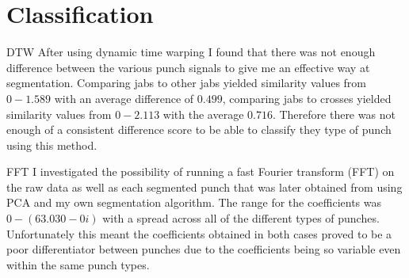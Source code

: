 \begin{figure}[h]
\begin{minipage}{6.0cm}
    \centering
    \label{fig:kinect3}
\end{minipage}
\end{figure}

\section{Classification}

DTW
After using dynamic time warping I found that there was not enough difference between the various punch signals to give me an effective way at segmentation. Comparing jabs to other jabs yielded similarity values from $0 - 1.589$ with an average difference of $0.499$, comparing jabs to crosses yielded similarity values from $0-2.113$ with the average $0.716$. Therefore there was not enough of a consistent difference score to be able to classify they type of punch using this method.

FFT
 I investigated the possibility of running a fast Fourier transform (FFT) on the raw data as well as each segmented punch that was later obtained from using PCA and my own segmentation algorithm. The range for the coefficients was $0 - (63.030 - 0i)$ with a spread across all of the different types of punches. 
Unfortunately this meant the coefficients obtained in both cases proved to be a poor differentiator between punches due to the coefficients being so variable even within the same punch types.

